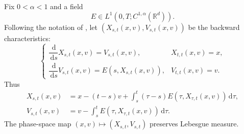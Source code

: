 \documentclass[11pt]{article}
\newcommand{\R}{\mathbb R}
\newcommand{\dd}{\,\mathrm d}
\begin{document}
Fix $0<\alpha<1$ and a field
\begin{equation}\label{field-assumption}
 E\in L^1(0,T;C^{1,\alpha}(\R^d)).
\end{equation}
Following the notation of \cite{HNXscreened,HNX2d}, let
$(X_{s,t}(x,v),V_{s,t}(x,v))$ be the backward characteristics:
\begin{equation}\label{backwardflow}
 \begin{cases}
  \dfrac{\dd}{\dd s}X_{s,t}(x,v)=V_{s,t}(x,v),
  &X_{t,t}(x,v)=x,\\[2mm]
  \dfrac{\dd}{\dd s}V_{s,t}(x,v)=E(s,X_{s,t}(x,v)),
  &V_{t,t}(x,v)=v.
 \end{cases}
\end{equation}
Thus
\begin{align}
 X_{s,t}(x,v)
 &=x-(t-s)v+\int_s^t(\tau-s)
     E(\tau,X_{\tau,t}(x,v))\dd\tau,\label{backward-X}\\
 V_{s,t}(x,v)
 &=v-\int_s^tE(\tau,X_{\tau,t}(x,v))\dd\tau.\label{backward-V}
\end{align}
The phase-space map $(x,v)\mapsto(X_{s,t},V_{s,t})$ preserves Lebesgue
measure.
\end{document}
